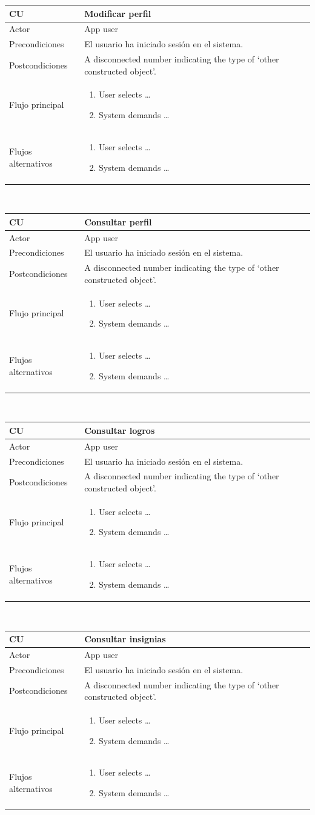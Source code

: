 \documentclass[twoside]{report}
\newcommand\addrow[2]{#1 &#2\\ }
\newcommand\addheading[2]{#1 &#2\\ \hline}
\newcommand\tabularhead{\begin{tabular}{lp{0.7\textwidth}}
\hline
}
\newcommand\addmulrow[2]{ \begin{minipage}[t][][t]{2.5cm}#1\end{minipage}%
   &\begin{minipage}[t][][t]{8cm}
    \begin{enumerate} #2   \end{enumerate}
    \end{minipage}\\ }
\newenvironment{usecase}{\tabularhead}
{\hline\end{tabular}}
\begin{document}
\begin{usecase}
  \addheading{\textbf{CU\arabic{usecase}}}{Modificar perfil} 
  \addrow{Actor}{App user}
  \addrow{Precondiciones}{El usuario ha iniciado sesión en el sistema.}
  \addrow{Postcondiciones}{A disconnected number indicating the type of `other constructed object'.}
  \addmulrow{Flujo principal}{
  		\item User selects \ldots
        \item System demands \ldots
  }
  \addmulrow{Flujos alternativos}{
  		\item User selects \ldots
        \item System demands \ldots
  }
\end{usecase}\\

\begin{usecase}
  \addheading{\textbf{CU\arabic{usecase}}}{Consultar perfil} 
  \addrow{Actor}{App user}
  \addrow{Precondiciones}{El usuario ha iniciado sesión en el sistema.}
  \addrow{Postcondiciones}{A disconnected number indicating the type of `other constructed object'.}
  \addmulrow{Flujo principal}{
  		\item User selects \ldots
        \item System demands \ldots
  }
  \addmulrow{Flujos alternativos}{
  		\item User selects \ldots
        \item System demands \ldots
  }
\end{usecase}\\

\begin{usecase}
  \addheading{\textbf{CU\arabic{usecase}}}{Consultar logros} 
  \addrow{Actor}{App user}
  \addrow{Precondiciones}{El usuario ha iniciado sesión en el sistema.}
  \addrow{Postcondiciones}{A disconnected number indicating the type of `other constructed object'.}
  \addmulrow{Flujo principal}{
  		\item User selects \ldots
        \item System demands \ldots
  }
  \addmulrow{Flujos alternativos}{
  		\item User selects \ldots
        \item System demands \ldots
  }
\end{usecase}\\

\begin{usecase}
  \addheading{\textbf{CU\arabic{usecase}}}{Consultar insignias} 
  \addrow{Actor}{App user}
  \addrow{Precondiciones}{El usuario ha iniciado sesión en el sistema.}
  \addrow{Postcondiciones}{A disconnected number indicating the type of `other constructed object'.}
  \addmulrow{Flujo principal}{
  		\item User selects \ldots
        \item System demands \ldots
  }
  \addmulrow{Flujos alternativos}{
  		\item User selects \ldots
        \item System demands \ldots
  }
\end{usecase}\\
\end{document}
